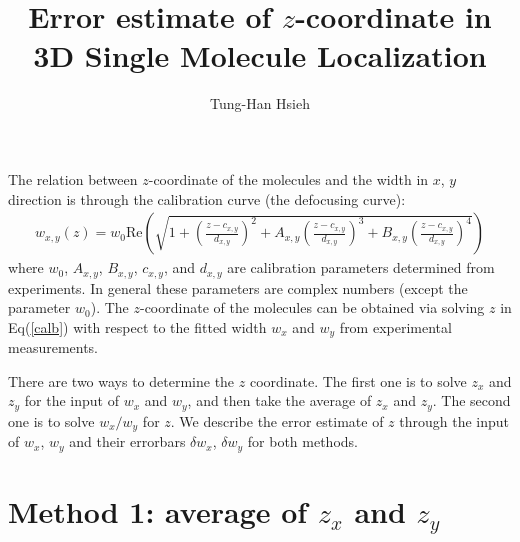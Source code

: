 \documentclass[12pt]{article}
\title{Error estimate of $z$-coordinate in 3D Single Molecule Localization}
\author{Tung-Han Hsieh}
\def\bea{\begin{eqnarray}}
\def\eea{\end{eqnarray}}
\def\Eq#1{Eq(\ref{#1})}
\def\Re{\mathrm{Re}}
\begin{document}
\maketitle

The relation between $z$-coordinate of the molecules and the width in
$x$, $y$ direction is through the calibration curve (the defocusing curve):
\bea\label{calb}
w_{x,y}(z) = w_0\Re\left(\sqrt{ 1 +
	\left(\frac{z-c_{x,y}}{d_{x,y}}\right)^2 +
	A_{x,y}\left(\frac{z-c_{x,y}}{d_{x,y}}\right)^3 +
	B_{x,y}\left(\frac{z-c_{x,y}}{d_{x,y}}\right)^4 }\right)
\eea
where $w_0$, $A_{x,y}$, $B_{x,y}$, $c_{x,y}$, and $d_{x,y}$ are calibration
parameters determined from experiments. In general these parameters are complex
numbers (except the parameter $w_0$). The $z$-coordinate of the molecules
can be obtained via solving $z$ in \Eq{calb} with respect to the
fitted width $w_x$ and $w_y$ from experimental measurements.

There are two ways to determine the $z$ coordinate. The first one is to
solve $z_x$ and $z_y$ for the input of $w_x$ and $w_y$, and then take the
average of $z_x$ and $z_y$. The second one is to solve $w_x/w_y$ for $z$.
We describe the error estimate of $z$ through the input of $w_x$, $w_y$
and their errorbars $\delta w_x$, $\delta w_y$ for both methods.

\section{Method 1: average of $z_x$ and $z_y$}
\end{document}
